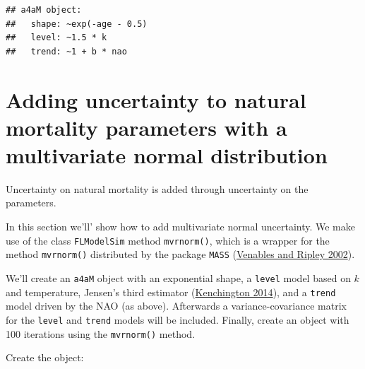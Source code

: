 \documentclass[
]{book}
\begin{document}
\begin{verbatim}
## a4aM object:
##   shape: ~exp(-age - 0.5)
##   level: ~1.5 * k
##   trend: ~1 + b * nao
\end{verbatim}

\hypertarget{adding-uncertainty-to-natural-mortality-parameters-with-a-multivariate-normal-distribution}{%
\section{Adding uncertainty to natural mortality parameters with a multivariate normal distribution}\label{adding-uncertainty-to-natural-mortality-parameters-with-a-multivariate-normal-distribution}}

Uncertainty on natural mortality is added through uncertainty on the parameters.

In this section we'll' show how to add multivariate normal uncertainty. We make use of the class \texttt{FLModelSim} method \texttt{mvrnorm()}, which is a wrapper for the method \texttt{mvrnorm()} distributed by the package \texttt{MASS} (\protect\hyperlink{ref-mass}{Venables and Ripley 2002}).

We'll create an \texttt{a4aM} object with an exponential shape, a \texttt{level} model based on \(k\) and temperature, Jensen's third estimator (\protect\hyperlink{ref-Kenchington2014}{Kenchington 2014}), and a \texttt{trend} model driven by the NAO (as above). Afterwards a variance-covariance matrix for the \texttt{level} and \texttt{trend} models will be included. Finally, create an object with 100 iterations using the \texttt{mvrnorm()} method.

Create the object:
\end{document}
